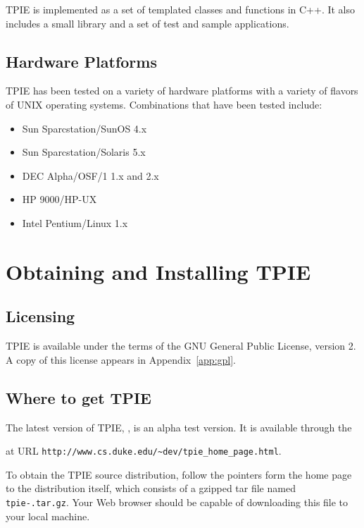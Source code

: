 TPIE is implemented as a set of templated classes and functions in
C++. It also includes a small library and a set of test and
sample applications.

\section{Hardware Platforms}

TPIE has been tested on a variety of hardware platforms with a variety
of flavors of UNIX operating systems.  Combinations that have been
tested include:
\begin{itemize}
\item Sun Sparcstation/SunOS 4.x 
\item Sun Sparcstation/Solaris 5.x
\item DEC Alpha/OSF/1 1.x and 2.x
\item HP 9000/HP-UX
\item Intel Pentium/Linux 1.x
\end{itemize}

\chapter{Obtaining and Installing TPIE}

\section{Licensing}

TPIE is available under the terms of the GNU General Public License,
version 2.  A copy of this license appears in Appendix~\ref{app:gpl}.

\section{Where to get TPIE}

The latest version of TPIE, \version, is an alpha test version.  It is
available through the %
\begin{latexonly}
at URL \verb|http://www.cs.duke.edu/~dev/tpie_home_page.html|.
\end{latexonly}

To obtain the TPIE source distribution, follow the
pointers form the home page to the distribution itself, which consists
of a gzipped tar file named {\tt tpie-\version.tar.gz}.  Your Web
browser should be capable of downloading this file to your local
machine.

